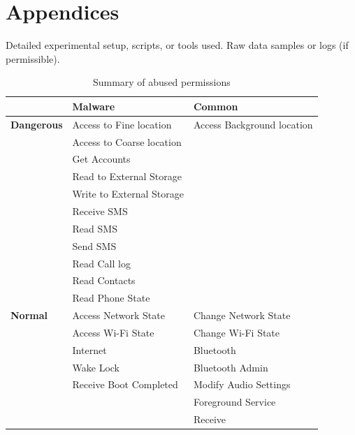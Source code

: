 \chapter{Appendices}
Detailed experimental setup, scripts, or tools used.
Raw data samples or logs (if permissible).

\begin{table}[H]
  \centering
  \begin{tabular}{l|l|l}
    \toprule
       & \textbf{Malware} & \textbf{Common} \\
    \midrule
      \textbf{Dangerous}  & Access to Fine location & Access Background location\\
       & Access to Coarse location & \\
       & Get Accounts & \\
       & Read to External Storage & \\
       & Write to External Storage  & \\
       & Receive SMS & \\
       & Read SMS & \\
       & Send SMS & \\
       & Read Call log & \\
       & Read Contacts & \\
       & Read Phone State & \\
    \midrule
      \textbf{Normal} & Access Network State & Change Network State\\
       & Access Wi-Fi State & Change Wi-Fi State\\
        & Internet & Bluetooth\\
        & Wake Lock & Bluetooth Admin\\
        & Receive Boot Completed & Modify Audio Settings\\
        & & Foreground Service\\
        & & Receive\\
    \bottomrule
  \end{tabular}
  \caption{Summary of abused permissions}
  \label{tab:summaryPermissions}
\end{table}


